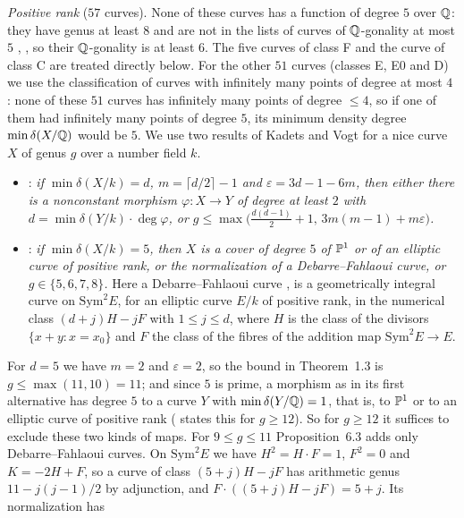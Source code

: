 \emph{Positive rank} ($57$ curves). None of these curves has a function of degree $5$ over $\mathbb{Q}$: they have genus
at least $8$ and are not in the lists of curves of $\mathbb{Q}$-gonality at most $5$ \cite{JeonKim2007},
\cite[Theorems~1.3--1.5]{Orlic2025}, so their $\mathbb{Q}$-gonality is at least $6$. The five curves of class F and the
curve of class C are treated directly below. For the other $51$ curves (classes E, E0 and D) we use the
classification of curves with infinitely many points of degree at most $4$
\cite[Theorems~1.4--1.6]{DerickxOrlic2026}: none of these $51$ curves has infinitely many points of degree $\le4$, so
if one of them had infinitely many points of degree $5$, its minimum density degree $\min\delta(X/\mathbb{Q})$ would be $5$.
We use two results of Kadets and Vogt for a nice curve $X$ of genus $g$ over a number field $k$.
\begin{itemize}
\item \cite[Theorem~1.3]{KadetsVogt2025}: \emph{if $\min\delta(X/k)=d$, $m=\lceil d/2\rceil-1$ and $\varepsilon=3d-1-6m$,
 then either there is a nonconstant morphism $\varphi\colon X\to Y$ of degree at least $2$ with
 $d=\min\delta(Y/k)\cdot\deg\varphi$, or $g\le\max\bigl(\frac{d(d-1)}2+1,\,3m(m-1)+m\varepsilon\bigr)$.}
\item \cite[Proposition~6.3 and Table~1]{KadetsVogt2025}: \emph{if $\min\delta(X/k)=5$, then $X$ is a cover of degree
 $5$ of $\mathbb{P}^1$ or of an elliptic curve of positive rank, or the normalization of a Debarre--Fahlaoui curve, or
 $g\in\{5,6,7,8\}$.} Here a Debarre--Fahlaoui curve \cite[Definition~5.1]{KadetsVogt2025}, \cite{DebarreFahlaoui1993}
 is a geometrically integral curve on $\mathrm{Sym}^2E$, for an elliptic curve $E/k$ of positive rank, in the
 numerical class $(d+j)H-jF$ with $1\le j\le d$, where $H$ is the class of the divisors $\{x+y:x=x_0\}$ and $F$ the
 class of the fibres of the addition map $\mathrm{Sym}^2E\to E$.
\end{itemize}
For $d=5$ we have $m=2$ and $\varepsilon=2$, so the bound in Theorem~1.3 is $g\le\max(11,10)=11$; and since $5$ is
prime, a morphism as in its first alternative has degree $5$ to a curve $Y$ with $\min\delta(Y/\mathbb{Q})=1$, that is, to
$\mathbb{P}^1$ or to an elliptic curve of positive rank (\cite[Corollary~2.5]{DerickxOrlic2026} states this for
$g\ge12$). So for $g\ge12$ it suffices to exclude these two kinds of maps. For $9\le g\le11$ Proposition~6.3 adds
only Debarre--Fahlaoui curves. On $\mathrm{Sym}^2E$ we have $H^2=H\cdot F=1$, $F^2=0$ and $K=-2H+F$, so a curve of
class $(5+j)H-jF$ has arithmetic genus $11-j(j-1)/2$ by adjunction, and $F\cdot((5+j)H-jF)=5+j$. Its normalization has

